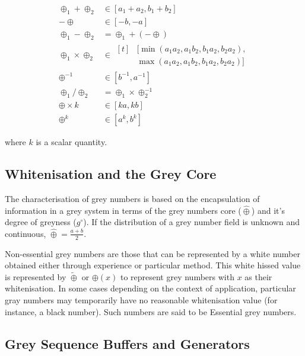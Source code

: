 \begin{subequations}
\begin{align}
  \oplus_1 + \oplus_2      &\in [a_1+a_2,b_1+b_2] \label{eq:grey_add}\\
           -\oplus         &\in [-b,-a] \label{eq:grey_neg} \\
  \oplus_1 - \oplus_2      &= \oplus_1+(-\oplus) \label{eq:grey_sub}\\
  \oplus_1 \times \oplus_2 &\in \begin{aligned}[t]
    &[\min(a_1 a_2, a_1 b_2, b_1 a_2, b_2 a_2), \\
    & \max(a_1 a_2, a_1 b_2, b_1 a_2, b_2 a_2)]
  \end{aligned} \label{grey_mult}\\
  \oplus^{-1} &\in [b^{-1}, a^{-1}] \label{eq:grey_inv}\\
  \oplus_1 / \oplus_2 & = \oplus_1 \times \oplus_2^{-1} \label{grey_mult} \\
  \oplus \times k &\in [ka,kb] \label{eq:grey_times_scalar}\\
  \oplus^k &\in [a^k, b^k] \label{eq:grey_exp}
\end{align}
\end{subequations}

where $k$ is a scalar quantity.
  
\subsection{Whitenisation and the Grey Core}

The characterisation of grey numbers is based on the encapsulation of information in a grey system in terms of the grey numbers core ($\hat\oplus$) and it's degree of greyness ($g^\circ$).
If the distribution of a grey number field is unknown and continuous, $\hat\oplus = \frac{a + b}{2}$.

Non-essential grey numbers are those that can be represented by a white number obtained either through experience or particular method. \cite{Liu2011}
This white hissed value is represented by $\tilde\oplus$ or $\oplus(x)$ to represent grey numbers with $x$ as their whitenisation.
In some cases depending on the context of application, particular gray numbers may temporarily have no reasonable whitenisation value (for instance, a black number). Such numbers are said to be Essential grey numbers.

\subsection{Grey Sequence Buffers and Generators}

